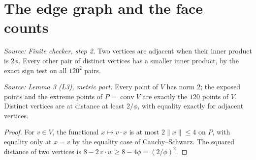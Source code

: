\section{The edge graph and the face counts}

\begin{definition}
  \label{def:edge-graph}
  \leanok
  \textit{Source: Finite checker, step 2.}
  Two vertices are adjacent when their inner product is \(2\phi\). Every
  other pair of distinct vertices has a smaller inner product, by the exact
  sign test on all \(120^2\) pairs.
\end{definition}

\begin{lemma}
  \label{lem:metric-data}
  \leanok
  \textit{Source: Lemma 3 (L3), metric part.}
  Every point of \(V\) has norm \(2\); the exposed points and the extreme
  points of \(P=\operatorname{conv}V\) are exactly the \(120\) points of
  \(V\). Distinct vertices are at distance at least \(2/\phi\), with
  equality exactly for adjacent vertices.
\end{lemma}
\begin{proof}
  \leanok
  For \(v\in V\), the functional \(x\mapsto v\cdot x\) is at most
  \(2\|x\|\le4\) on \(P\), with equality only at \(x=v\) by the equality
  case of Cauchy--Schwarz. The squared distance of two vertices is
  \(8-2\,v\cdot w\ge8-4\phi=(2/\phi)^2\).
\end{proof}

